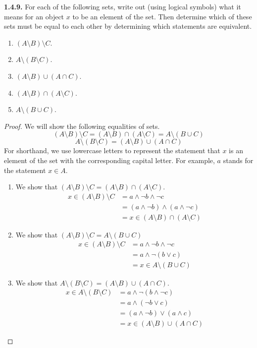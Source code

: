 \documentclass[12pt]{amsart}
\newenvironment{statement}[1]{\smallskip\noindent\color[rgb]{.6627, .3529, .6314} {\bf #1.}}{}
\theoremstyle{definition}
\theoremstyle{remark}
\begin{document}
\begin{statement}{1.4.9}
For each of the following sets, write out (using logical symbols) what it means for an object $x$ to be an element of the set.
Then determine which of these sets must be equal to each other by determining which statements are equivalent.
\begin{enumerate}
	\item $(A \setminus B) \setminus C$.
	\item $A \setminus (B \setminus C)$.
	\item $(A \setminus B) \cup (A \cap C)$.
	\item $(A \setminus B) \cap (A \setminus C)$.
	\item $A \setminus (B \cup C)$.
\end{enumerate}
\end{statement}

\begin{proof}
We will show the following equalities of sets.
\begin{equation*}
	(A \setminus B) \setminus C = (A \setminus B) \cap (A \setminus C) = A \setminus (B \cup C)
\end{equation*}
\begin{equation*}
	A \setminus (B \setminus C) = (A \setminus B) \cup (A \cap C)
\end{equation*}
For shorthand, we use lowercase letters to represent the statement that $x$ is an element of the set with the corresponding capital letter.
For example, $a$ stands for the statement $x \in A$.
\begin{enumerate}
	\item We show that $(A \setminus B) \setminus C = (A \setminus B) \cap (A \setminus C)$.
	\begin{align*}
		x \in (A \setminus B) \setminus C
		&= a \wedge \neg b \wedge \neg c \\
		&= (a \wedge \neg b) \wedge (a \wedge \neg c) \\
		&= x \in (A \setminus B) \cap (A \setminus C)
	\end{align*}
	
	\item We show that $(A \setminus B) \setminus C = A \setminus (B \cup C)$
	\begin{align*}
		x \in (A \setminus B) \setminus C
		&= a \wedge \neg b \wedge \neg c \\
		&= a \wedge \neg (b \vee c) \\
		&= x \in A \setminus (B \cup C)
	\end{align*}
	
	\item We show that $A \setminus (B \setminus C) = (A \setminus B) \cup (A \cap C)$.
	\begin{align*}
		x \in A \setminus (B \setminus C)
		&= a \wedge \neg (b \wedge \neg c) \\
		&= a \wedge (\neg b \vee c) \\
		&= (a \wedge \neg b) \vee (a \wedge c) \\
		&= x \in (A \setminus B) \cup (A \cap C)
	\end{align*}
\end{enumerate}
\end{proof}
\end{document}
